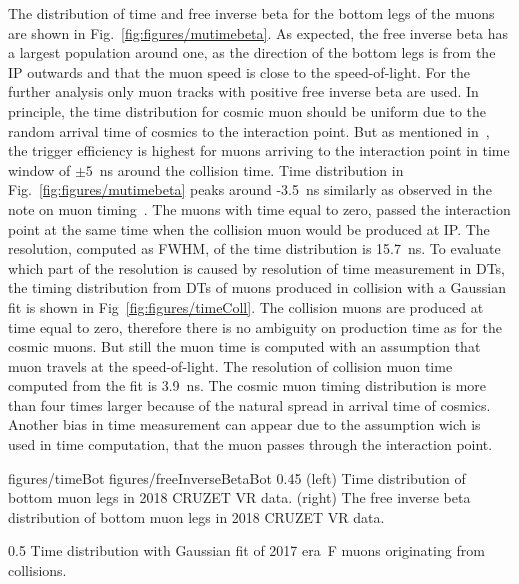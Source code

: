 The distribution of time and free inverse beta for the bottom legs of the muons are shown in Fig.~\ref{fig:figures/mutimebeta}. As expected, the free inverse beta has  a largest population around one, as the direction of the bottom legs is from the IP outwards and that the muon speed is close to the speed-of-light. For the further analysis only muon tracks with positive free inverse beta are used. In principle, the time distribution for cosmic muon should be uniform due to the random arrival time of cosmics to the interaction point. But as mentioned in~\cite{Chatrchyan:2009ig}, the trigger efficiency is highest for muons arriving to the interaction point in time window of $\pm 5$~ns around the collision time. Time distribution in Fig.~\ref{fig:figures/mutimebeta} peaks around -3.5~ns similarly as observed in the note on muon timing~\cite{Traczyk:1365029}. The muons with time equal to zero, passed the interaction point at the same time when the collision muon would be produced at IP. The resolution, computed as FWHM, of the time distribution is 15.7~ns. To evaluate which part of the resolution is caused by resolution of time measurement in DTs, the timing distribution from DTs of muons produced in collision with a Gaussian fit is shown in Fig~\ref{fig:figures/timeColl}. The collision muons are produced at time equal to zero, therefore there is no ambiguity on production time as for the cosmic muons. But still the muon time is computed with an assumption that muon travels at the speed-of-light. The resolution of collision muon time computed from the fit is 3.9~ns. The cosmic muon timing distribution is more than four times larger because of the natural spread in arrival time of cosmics. Another bias in time measurement can appear due to the assumption wich is used in time computation, that the muon passes through the interaction point.
 

                 {figures/timeBot}
                 {figures/freeInverseBetaBot} %
                 {0.45}       %
                 {(left) Time distribution of bottom muon legs in 2018 CRUZET VR data. (right) The free inverse beta distribution of bottom muon legs in 2018 CRUZET VR data.}


                 {0.5}       %
                 { Time distribution with Gaussian fit of 2017 era~F muons originating from collisions.  }


